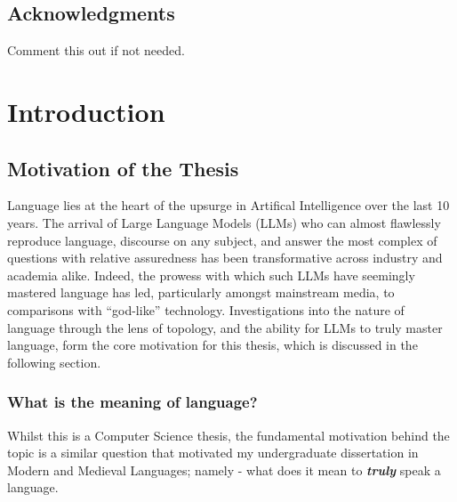 \documentclass[12pt,twoside]{report}
\begin{document}
\section*{Acknowledgments}
Comment this out if not needed.

\clearpage{\pagestyle{empty}\cleardoublepage}

\tableofcontents 


\clearpage{\pagestyle{empty}\cleardoublepage}
\setcounter{page}{1}
\fancyhead[LE,RO]{\slshape \rightmark}
\fancyhead[LO,RE]{}

\chapter{Introduction}
\section{Motivation of the Thesis}
Language lies at the heart of the upsurge in Artifical Intelligence over the last 10 years. The arrival of Large Language Models (LLMs) who can almost flawlessly reproduce language, discourse on any subject, and answer the most complex of questions with relative assuredness has been transformative across industry and academia alike. Indeed, the prowess with which such LLMs have seemingly mastered language has led, particularly amongst mainstream media, to comparisons with ``god-like'' technology. \cite{hogarthFT} Investigations into the nature of language through the lens of topology, and the ability for LLMs to truly master language, form the core motivation for this thesis, which is discussed in the following section. 


\subsection{What is the meaning of language?}

Whilst this is a Computer Science thesis, the fundamental motivation behind the topic is a similar question that motivated my undergraduate dissertation in Modern and Medieval Languages; namely - what does it mean to \textbf{\textit{truly}} speak a language. \newline \par
\end{document}
